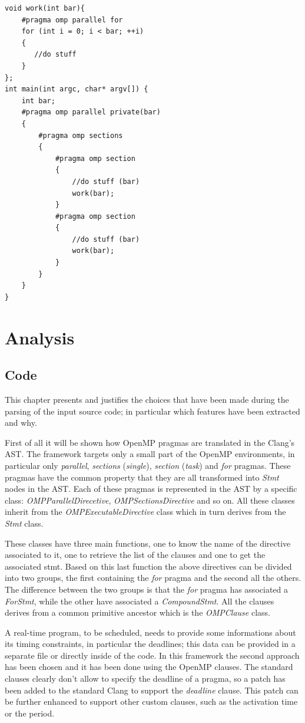 \documentclass[a4paper,12pt,oneside]{book}
\begin{document}
\begin{lstlisting}[language=CCC, caption=Sample code, label=code]
void work(int bar){
    #pragma omp parallel for
    for (int i = 0; i < bar; ++i)
    {
       //do stuff
    }  
};
int main(int argc, char* argv[]) {
    int bar;
    #pragma omp parallel private(bar)
    {
        #pragma omp sections
        {
            #pragma omp section
            {   
                //do stuff (bar)
                work(bar);
            }
            #pragma omp section
            {
                //do stuff (bar)
                work(bar);
            }
        }
    }
}
\end{lstlisting}


\section{Analysis}
\subsection{Code}
\label{patch}
This chapter presents and justifies the choices that have been made during the parsing of the input source code; in particular which features have been extracted and why.

First of all it will be shown how OpenMP pragmas are translated in the Clang’s AST. The framework targets only a small part of the OpenMP environments, in particular only \emph{parallel}, \emph{sections} (\emph{single}), \emph{section} (\emph{task}) and \emph{for} pragmas. These pragmas have the common property that they are all transformed into \emph{Stmt} nodes in the AST. Each of these pragmas is represented in the AST by a specific class: \emph{OMPParallelDirecetive}, \emph{OMPSectionsDirective} and so on. All these classes inherit from the \emph{OMPExecutableDirective} class which in turn derives from the \emph{Stmt} class. 

These classes have three main functions, one to know the name of the directive associated to it, one to retrieve the list of the clauses and one to get the associated stmt. Based on this last function the above directives can be divided into two groups, the first containing the \emph{for} pragma and the second all the others. The difference between the two groups is that the \emph{for} pragma has associated a \emph{ForStmt}, while the other have associated a \emph{CompoundStmt}. All the clauses derives from a common primitive ancestor which is the \emph{OMPClause} class. 

A real-time program, to be scheduled, needs to provide some informations about its timing constraints, in particular the deadlines; this data can be provided in a separate file or directly inside of the code. In this framework the second approach has been chosen and it has been done using the OpenMP clauses. The standard clauses clearly don’t allow to specify the deadline of a pragma, so a patch has been added to the standard Clang to support the \emph{deadline} clause. This patch can be further enhanced to support other custom clauses, such as the activation time or the period.
\end{document}
